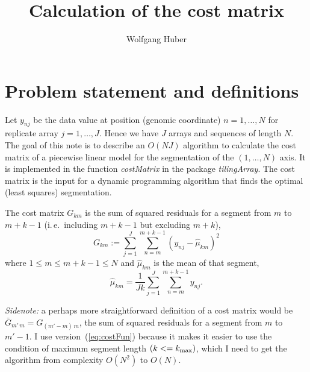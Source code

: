 \documentclass[11pt]{article}
\begin{document}
\title{Calculation of the cost matrix}
\author{Wolfgang Huber}
\maketitle

\section{Problem statement and definitions}
Let $y_{nj}$ be the data value at position (genomic coordinate)
$n=1,\ldots,N$ for replicate array $j=1,\ldots,J$. Hence we have $J$
arrays and sequences of length $N$.  The goal of this note is to
describe an $O(NJ)$ algorithm to calculate the cost matrix of a
piecewise linear model for the segmentation of the $(1,\ldots,N)$ axis.
It is implemented in the function \textit{costMatrix} in the package
\textit{tilingArray}. The cost matrix is the input for a dynamic
programming algorithm that finds the optimal (least squares)
segmentation.


The cost matrix $G_{km}$ is the sum of squared residuals for a segment
from $m$ to $m+k-1$ (i.\,e.\ including $m+k-1$ but excluding $m+k$),
\begin{equation}\label{eq:costFun}
G_{km} := \sum_{j=1}^J \sum_{n=m}^{m+k-1} 
\left(y_{nj} - \hat{\mu}_{km} \right)^2
\end{equation}
where $1\le m \le m+k-1\le N$ and $\hat{\mu}_{km}$ is the mean of that segment,
\begin{equation}\label{eq:defmu}
\hat{\mu}_{km} = \frac{1}{Jk} \sum_{j=1}^J \sum_{n=m}^{m+k-1} y_{nj}.
\end{equation}

\textit{Sidenote:} a perhaps more straightforward definition of a cost
matrix would be $\bar{G}_{m'\,m} = G_{(m'-m)\,m}$, the sum of squared
residuals for a segment from $m$ to $m'-1$. I use
version~(\ref{eq:costFun}) because it makes it easier to use the
condition of maximum segment length $(k<=k_{\mbox{\scriptsize max}})$, 
which I need to get the algorithm from complexity $O(N^2)$ to $O(N)$.

\newpage
\end{document}
